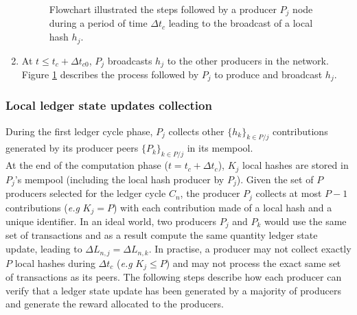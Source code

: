 \begin{enumerate}
\begin{figure}[H]
\label{fig:LLSU}
\caption{\label{fig:LLSU} Flowchart illustrated the steps followed by a producer $P_j$ node during a period of time $\Delta t_{c}$ leading to the broadcast of a local hash $h_j$.}
\end{figure}
\item At $t \leq t_c + \Delta t_{c0}$, $P_j$ broadcasts $h_j$ to the other producers in the network. Figure \ref{fig:LLSU} describes the process followed by $P_j$ to produce and broadcast $h_j$.  
\end{enumerate}

\subsubsection{Local ledger state updates collection}

During the first ledger cycle phase, $P_j$ collects other $\{h_k\}_{k \in P/j}$ contributions generated by its producer peers $\{P_k\}_{k \in P/j}$ in its mempool. \\

At the end of the computation phase ($t = t_c + \Delta t_{c}$), $K_j$ local hashes are stored in $P_j$'s mempool (including the local hash producer by $P_j$). Given the set of $P$ producers selected for the ledger cycle $C_n$, the producer $P_j$ collects at most $P - 1$ contributions (\textit{e.g} $K_j = P$) with each contribution made of a local hash and a unique identifier. In an ideal world, two producers $P_j$ and $P_k$ would use the same set of transactions and as a result compute the same quantity ledger state update, leading to $\Delta L_{n,j} = \Delta L_{n,k}$. In practise, a producer may not collect exactly $P$ local hashes during $\Delta t_{c}$  (\textit{e.g} $K_j \leq P$) and may not process the exact same set of transactions as its peers. The following steps describe how each producer can verify that a ledger state update has been generated by a majority of producers and generate the reward allocated to the producers. 

